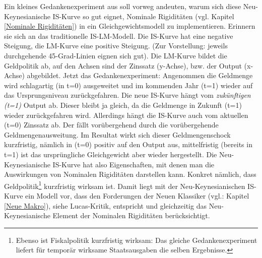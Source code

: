 Ein kleines Gedankenexperiment aus \textcite[S. 243]{Romer2019} soll vorweg andeuten, warum sich diese Neu-Keynesianische IS-Kurve so gut eignet, Nominale Rigiditäten (vgl. Kapitel \ref{Nominale Rigiditäten}) in ein Gleichgewichtsmodell zu implementieren. Erinnern sie sich an das traditionelle IS-LM-Modell. Die IS-Kurve hat eine negative Steigung, die LM-Kurve eine positive Steigung. (Zur Vorstellung: jeweils durchgehende 45-Grad-Linien eignen sich gut). Die LM-Kurve bildet die Geldpolitik ab, auf den Achsen sind der Zinssatz (y-Achse), bzw. der Output (x-Achse) abgebildet. Jetzt das Gedankenexperiment: Angenommen die Geldmenge wird schlagartig (in t=0) ausgeweitet und im kommenden Jahr (t=1) wieder auf das Ursprungsniveau zurückgefahren. Die neue IS-Kurve hängt vom \textit{zukünftigen (t=1)} Output ab. Dieser bleibt ja gleich, da die Geldmenge in Zukunft (t=1) wieder zurückgefahren wird. Allerdings hängt die IS-Kurve auch vom aktuellen (t=0) Zinssatz ab. Der fällt vorübergehend durch die vorübergehende Geldmengenausweitung. Im Resultat wirkt sich dieser Geldmengenschock kurzfristig, nämlich in (t=0) positiv auf den Output aus, mittelfristig (bereits in t=1) ist das ursprüngliche Gleichgewicht aber wieder hergestellt. Die Neu-Keynesianische IS-Kurve hat also Eigenschaften, mit denen man die Auswirkungen von Nominalen Rigiditäten darstellen kann. Konkret nämlich, dass Geldpolitik\footnote{Ebenso ist Fiskalpolitik kurzfristig wirksam: Das gleiche Gedankenexperiment liefert für temporär wirksame Staatsausgaben die selben Ergebnisse.} kurzfristig wirksam ist. Damit liegt mit der Neu-Keynesianischen IS-Kurve ein Modell vor, dass den Forderungen der Neuen Klassiker (vgl.: Kapitel \ref{Neue Makro}), siehe Lucas-Kritik, entspricht und gleichzeitig das Neu-Keynesianische Element der Nominalen Rigiditäten berücksichtigt.

